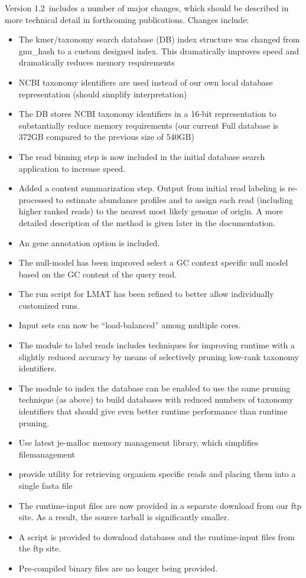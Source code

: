\documentclass[11pt]{article}
\begin{document}
Version 1.2~includes a number of major changes, which should be described in more technical detail in forthcoming publications.  Changes include:
\begin{itemize}
\item The kmer/taxonomy search database (DB) index structure was changed from gnu\_hash to a custom designed index.
This dramatically improves speed and dramatically reduces memory requirements
\item NCBI taxonomy identifiers are used instead of our own local database representation (should simplify interpretation)
\item The DB stores NCBI taxonomy identifiers in a 16-bit representation to substantially reduce memory requirements
(our current Full database is 372GB compared to the previous size of 540GB)
\item The read binning step is now included in the initial database search application to increase speed.
\item Added a content summarization step.  Output from initial read labeling is re-processed to estimate abundance profiles
and to assign each read (including higher ranked reads) to the nearest most likely genome of origin. A more detailed description
of the method is given later in the documentation.
\item An gene annotation option is included.
\item The null-model has been improved select a GC context specific null model based on the GC content of the query read.
\item The run script for LMAT has been refined to better allow individually customized runs.
\item Input sets can now be ``load-balanced'' among multiple cores. 
\item The module to label reads includes techniques for improving runtime with a slightly reduced accuracy by means of selectively pruning low-rank taxonomy identifiers.  
\item The module to index the database can be enabled to use the same pruning technique (as above) to build databases with reduced numbers of taxonomy identifiers that should give even better runtime performance than runtime pruning.
\item Use latest je-malloc memory management library, which simplifies filemanagement
\item provide utility for retrieving organism specific reads and placing them into a single fasta file
\item The runtime-input files are now provided in a separate download from our ftp site.  As a result, the source tarball is significantly smaller.
\item A script is provided to download databases and the runtime-input files from the ftp site.
\item Pre-compiled binary files are no longer being provided.
\end{itemize}
\end{document}
